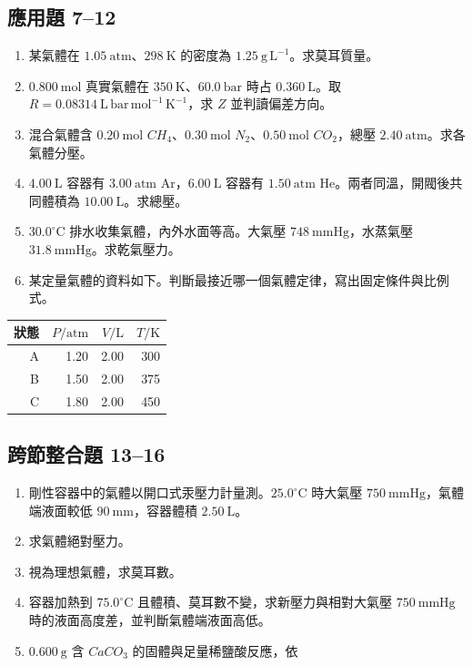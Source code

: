\documentclass[11pt,a4paper]{article}
\newcounter{none}
\providecommand{\tightlist}{%
  \setlength{\itemsep}{0pt}\setlength{\parskip}{0pt}}
\begin{document}
\subsection{應用題 7--12}\label{ux61c9ux7528ux984c-712}

\begin{enumerate}
\def\labelenumi{\arabic{enumi}.}
\setcounter{enumi}{6}
\tightlist
\item
  某氣體在 \(1.05\ \mathrm{atm}\)、\(298\ \mathrm K\) 的密度為 \(1.25\ \mathrm{g\,L^{-1}}\)。求莫耳質量。
\item
  \(0.800\ \mathrm{mol}\) 真實氣體在 \(350\ \mathrm K\)、\(60.0\ \mathrm{bar}\) 時占 \(0.360\ \mathrm L\)。取 \(R=0.08314\ \mathrm{L\,bar\,mol^{-1}\,K^{-1}}\)，求 \(Z\) 並判讀偏差方向。
\item
  混合氣體含 \(0.20\ \mathrm{mol}\) \(CH_4\)、\(0.30\ \mathrm{mol}\) \(N_2\)、\(0.50\ \mathrm{mol}\) \(CO_2\)，總壓 \(2.40\ \mathrm{atm}\)。求各氣體分壓。
\item
  \(4.00\ \mathrm L\) 容器有 \(3.00\ \mathrm{atm}\) Ar，\(6.00\ \mathrm L\) 容器有 \(1.50\ \mathrm{atm}\) He。兩者同溫，開閥後共同體積為 \(10.00\ \mathrm L\)。求總壓。
\item
  \(30.0^\circ\mathrm C\) 排水收集氣體，內外水面等高。大氣壓 \(748\ \mathrm{mmHg}\)，水蒸氣壓 \(31.8\ \mathrm{mmHg}\)。求乾氣壓力。
\item
  某定量氣體的資料如下。判斷最接近哪一個氣體定律，寫出固定條件與比例式。
\end{enumerate}

{\def\LTcaptype{none} %
\begin{longtable}[]{@{}rrrr@{}}
\toprule\noalign{}
狀態 & \(P/\mathrm{atm}\) & \(V/\mathrm L\) & \(T/\mathrm K\) \\
\midrule\noalign{}
\endhead
\bottomrule\noalign{}
\endlastfoot
A & 1.20 & 2.00 & 300 \\
B & 1.50 & 2.00 & 375 \\
C & 1.80 & 2.00 & 450 \\
\end{longtable}
}

\subsection{跨節整合題 13--16}\label{ux8de8ux7bc0ux6574ux5408ux984c-1316}

\begin{enumerate}
\def\labelenumi{\arabic{enumi}.}
\setcounter{enumi}{12}
\item
  剛性容器中的氣體以開口式汞壓力計量測。\(25.0^\circ\mathrm C\) 時大氣壓 \(750\ \mathrm{mmHg}\)，氣體端液面較低 \(90\ \mathrm{mm}\)，容器體積 \(2.50\ \mathrm L\)。
\item
  求氣體絕對壓力。
\item
  視為理想氣體，求莫耳數。
\item
  容器加熱到 \(75.0^\circ\mathrm C\) 且體積、莫耳數不變，求新壓力與相對大氣壓 \(750\ \mathrm{mmHg}\) 時的液面高度差，並判斷氣體端液面高低。
\item
  \(0.600\ \mathrm g\) 含 \(CaCO_3\) 的固體與足量稀鹽酸反應，依
\end{enumerate}
\end{document}
